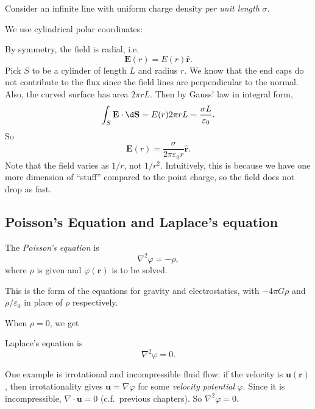 \documentclass[a4paper]{article}
\begin{document}
\begin{eg}
  Consider an infinite line with uniform charge density \emph{per unit length} $\sigma$.

  We use cylindrical polar coordinates:
  \begin{center}
  \end{center}
  By symmetry, the field is radial, i.e.
  \[
    \mathbf{E}(r) = E(r) \hat{\mathbf{r}}.
  \]
  Pick $S$ to be a cylinder of length $L$ and radius $r$. We know that the end caps do not contribute to the flux since the field lines are perpendicular to the normal. Also, the curved surface has area $2\pi r L$. Then by Gauss' law in integral form,
  \[
    \int_S\mathbf{E}\cdot \d \mathbf{S} = E(r)2\pi rL = \frac{\sigma L}{\varepsilon_0}.
  \]
  So
  \[
    \mathbf{E}(r) = \frac{\sigma}{2\pi \varepsilon_0 r} \hat{\mathbf{r}}.
  \]
  Note that the field varies as $1/r$, not $1/r^2$. Intuitively, this is because we have one more dimension of ``stuff'' compared to the point charge, so the field does not drop as fast.
\end{eg}

\subsection{Poisson's Equation and Laplace's equation}
\begin{defi}
  The \emph{Poisson's equation} is
  \[
    \nabla^2 \varphi = -\rho,
  \]
  where $\rho$ is given and $\varphi(\mathbf{r})$ is to be solved.
\end{defi}
This is the form of the equations for gravity and electrostatics, with $-4\pi G \rho$ and $\rho/\varepsilon_0$ in place of $\rho$ respectively.

When $\rho = 0$, we get
\begin{defi}
  Laplace's equation is
  \[
    \nabla^2 \varphi = 0.
  \]
\end{defi}
One example is irrotational and incompressible fluid flow: if the velocity is $\mathbf{u}(\mathbf{r})$, then irrotationality gives $\mathbf{u} = \nabla \varphi$ for some \emph{velocity potential} $\varphi$. Since it is incompressible, $\nabla\cdot \mathbf{u} = 0$ (c.f.\ previous chapters). So $\nabla^2 \varphi = 0$.
\end{document}
